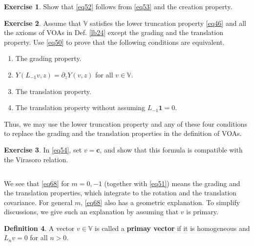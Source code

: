 \documentclass[12pt,a4paper,notitlepage]{article}
\theoremstyle{definition}
\newtheorem{df}{Definition}[section]
\newtheorem{exe}[df]{Exercise}
\theoremstyle{plain}
\newcommand{\id}{\mathbf{1}}
\newcommand{\Vbb}{\mathbb V}
\newcommand{\cbf}{\mathbf c}
\numberwithin{equation}{section}
\begin{document}
\begin{exe}
Show that \eqref{eq52} follows from \eqref{eq53} and the creation property.
\end{exe}



\begin{exe}
Assume that $\Vbb$ satisfies the lower truncation property \eqref{eq46} and all the axioms of VOAs in Def. \ref{lb24} except the grading and the translation property. Use \eqref{eq50} to prove that the following conditions are equivalent.
\begin{enumerate}
	\item The grading property.
	\item $Y(L_{-1}v,z)=\partial_zY(v,z)$ for all $v\in\Vbb$.
	\item The translation property.
	\item The translation property without assuming $L_{-1}\id=0$.
\end{enumerate} 
Thus, we may use the lower truncation property and any of these four conditions to replace the grading and the translation properties in the definition of VOAs.
\end{exe}

\begin{exe}\label{lb37}
In \eqref{eq54}, set $v=\cbf$, and show that this formula is compatible with the Virasoro relation. 
\end{exe}



\subsection{}\label{lb43}

We see that \eqref{eq68} for $m=0,-1$ (together with \eqref{eq51}) means the grading and the translation properties, which integrate to the rotation and the translation covariance. For general $m$, \eqref{eq68} also has a geometric explanation. To simplify discussions, we give such an explanation by assuming that $v$ is primary.

\begin{df}
A vector $v\in\Vbb$ is called a \textbf{primay vector} if it is homogeneous and $L_nv=0$ for all $n>0$.
\end{df}
\end{document}
